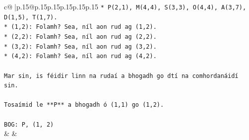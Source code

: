 \documentclass{article}
\begin{document}
{\begin{supertabular}{c@{$\;$}|p{.15\linewidth}@{}p{.15\linewidth}p{.15\linewidth}p{.15\linewidth}p{.15\linewidth}p{.15\linewidth}}
{{{\texttt{*   P(2,1), M(4,4), S(3,3), O(4,4), A(3,7), D(1,5), T(1,7).} \\
\texttt{*   (1,2): Folamh? Sea, níl aon rud ag (1,2).} \\
\texttt{*   (2,2): Folamh? Sea, níl aon rud ag (2,2).} \\
\texttt{*   (3,2): Folamh? Sea, níl aon rud ag (3,2).} \\
\texttt{*   (4,2): Folamh? Sea, níl aon rud ag (4,2).} \\
\\ 
\texttt{Mar sin, is féidir linn na rudaí a bhogadh go dtí na comhordanáidí sin.} \\
\\ 
\texttt{Tosaímid le **P** a bhogadh ó (1,1) go (1,2).} \\
\\ 
\texttt{BOG: P, (1, 2)} \\
            }
        }
    }
    & & \\ \\


\end{supertabular}}
\end{document}
